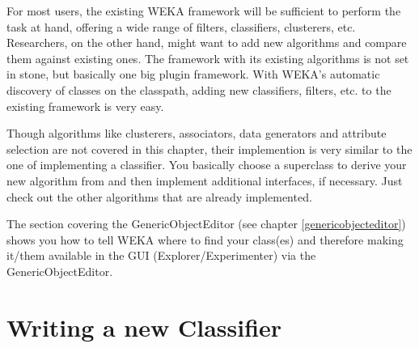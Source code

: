 %
%
%
%


For most users, the existing WEKA framework will be sufficient to perform the
task at hand, offering a wide range of filters, classifiers, clusterers, etc.
Researchers, on the other hand, might want to add new algorithms and compare
them against existing ones. The framework with its existing algorithms is not
set in stone, but basically one big plugin framework. With WEKA's automatic
discovery of classes on the classpath, adding new classifiers, filters, etc. to
the existing framework is very easy.

Though algorithms like clusterers, associators, data generators and
attribute selection are not covered in this chapter, their implemention is very
similar to the one of implementing a classifier. You basically choose a
superclass to derive your new algorithm from and then implement additional
interfaces, if necessary. Just check out the other algorithms that are already
implemented.

The section covering the GenericObjectEditor (see chapter
\ref{genericobjecteditor}) shows you how to tell WEKA where to find your
class(es) and therefore making it/them available in the GUI
(Explorer/Experimenter) via the GenericObjectEditor.


\clearpage
\section{Writing a new Classifier}
